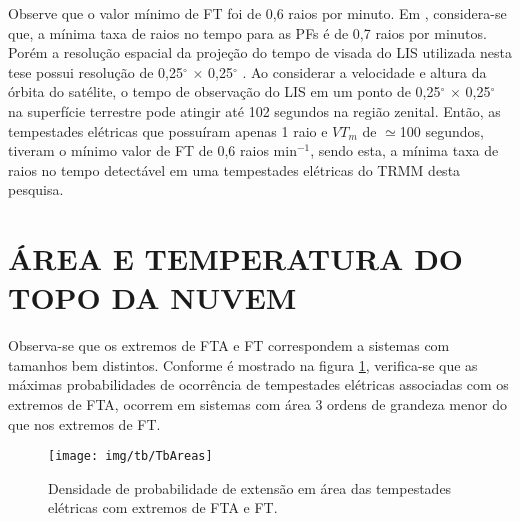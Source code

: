 Observe que o valor mínimo de FT foi de 0,6 raios por minuto. Em , considera-se que, a mínima taxa de raios no tempo para as PFs é de 0,7 raios por minutos. Porém a resolução espacial da projeção do tempo de visada do LIS utilizada nesta tese possui resolução de 0,25$^{\circ}$ $\times$ 0,25$^{\circ}$  \cite{albrecht2009tropical,albrecht2011b}. Ao considerar a velocidade e altura da órbita do satélite, o tempo de observação do LIS em um ponto de 0,25$^{\circ}$ $\times$ 0,25$^{\circ}$ na superfície terrestre pode atingir até 102 segundos na região zenital. Então, as tempestades elétricas que possuíram apenas 1 raio e $VT_m$ de $\simeq$100 segundos, tiveram o mínimo valor de FT de 0,6 raios min$^{-1}$, sendo esta, a mínima taxa de raios no tempo detectável em uma tempestades elétricas do TRMM desta pesquisa.



\section{ÁREA E TEMPERATURA DO TOPO DA NUVEM}

Observa-se que os extremos de FTA e FT correspondem a sistemas com tamanhos bem distintos. Conforme é mostrado na figura \ref{size}, verifica-se que as máximas probabilidades de ocorrência de tempestades elétricas associadas com os extremos de FTA, ocorrem em sistemas com área 3 ordens de grandeza menor do que nos extremos de FT.

\begin{figure}[!ht]
  \centering
  \texttt{[image: img/tb/TbAreas]}   
  \caption{Densidade de probabilidade de extensão em área das tempestades elétricas com extremos de FTA e FT.}
  \label{size}  
\end{figure}



